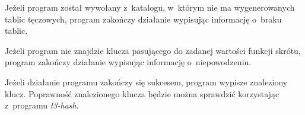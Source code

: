 \documentclass{article}
\begin{document}
Jeżeli program został wywołany z~katalogu, w~którym nie ma wygenerowanych tablic tęczowych, program zakończy działanie wypisując informację o~braku tablic.

Jeżeli program nie znajdzie klucza pasującego do zadanej wartości funkcji skrótu, program zakończy działanie wypisując informację o~niepowodzeniu.

Jeżeli działanie programu zakończy się sukcesem, program wypisze znaleziony klucz. Poprawność znalezionego klucza będzie można sprawdzić korzystając z~programu \emph{t3-hash}.
\end{document}
